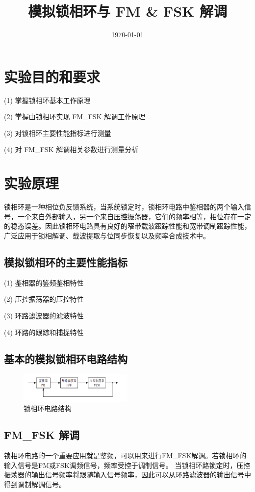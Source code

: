 \documentclass{../source/Experiment}
\title{模拟锁相环与 FM \& FSK 解调}
\date{\today}
\begin{document}
\makecover
\makeheader
\section{实验目的和要求}
 (1) 掌握锁相环基本工作原理

(2) 掌握由锁相环实现 FM\_FSK 解调工作原理

(3) 对锁相环主要性能指标进行测量

(4) 对 FM\_FSK 解调相关参数进行测量分析


\section{实验原理}
锁相环是一种相位负反馈系统，当系统锁定时，锁相环电路中鉴相器的两个输入信号，一个来自外部输入，另一个来自压控振荡器，它们的频率相等，相位存在一定的稳态误差。因此锁相环电路具有良好的窄带载波跟踪性能和宽带调制跟踪性能，广泛应用于锁相解调、载波提取与位同步恢复以及频率合成技术中。

\subsection{模拟锁相环的主要性能指标}

(1) 鉴相器的鉴频鉴相特性

(2) 压控振荡器的压控特性

(3) 环路滤波器的滤波特性

(4) 环路的跟踪和捕捉特性
\subsection{基本的模拟锁相环电路结构}
\begin{figure}[H]
    \centering
    \includegraphics[width = 0.5\textwidth]{lab4/2.png}
    \caption{锁相环电路结构}
\end{figure}



\subsection{FM\_FSK 解调}
锁相环电路的一个重要应用就是鉴频，可以用来进行FM\_FSK解调。若锁相环的输入信号是FM或FSK调频信号，频率受控于调制信号。
当锁相环路锁定时，压控振荡器的输出信号频率将跟随输入信号频率，因此可以从环路滤波器的输出信号中得到调制解调信号。
\end{document}
